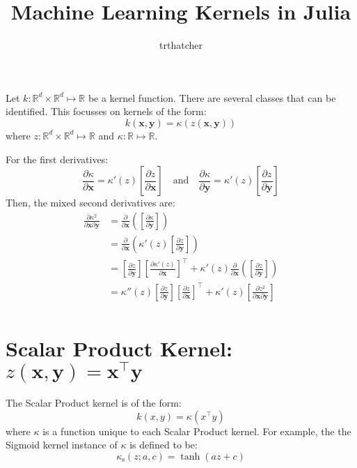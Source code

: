 \documentclass[12pt, a4paper]{article}
\begin{document}

\title{Machine Learning Kernels in Julia}
\author{trthatcher}
\maketitle

Let $k:\mathbb{R}^d \times \mathbb{R}^d \mapsto \mathbb{R}$ be a kernel function. There are several classes that can be identified. This focusses on kernels of the form:
\begin{equation*}
    k(\mathbf{x}, \mathbf{y}) = \kappa(z(\mathbf{x}, \mathbf{y}))
\end{equation*}
where $z:\mathbb{R}^d \times \mathbb{R}^d \mapsto \mathbb{R}$ and $\kappa:\mathbb{R} \mapsto \mathbb{R}$.

For the first derivatives:
\begin{equation*}
    \frac{\partial \kappa}{\partial \mathbf{x}} 
    = \kappa'(z) \left[\frac{\partial z}{\partial \mathbf{x}}\right]
    \quad \text{and} \quad
    \frac{\partial \kappa}{\partial \mathbf{y}} 
    = \kappa'(z) \left[\frac{\partial z}{\partial \mathbf{y}}\right]
\end{equation*}
Then, the mixed second derivatives are:
\begin{align*}
    \frac{\partial \kappa^2}{\partial \mathbf{x} \partial \mathbf{y}}
    &= \frac{\partial}{\partial \mathbf{x}}\left(\left[\frac{\partial \kappa}{\partial \mathbf{y}}\right]\right)\\
    &= \frac{\partial}{\partial \mathbf{x}}\left(\kappa'(z)
    \left[\frac{\partial z}{\partial \mathbf{y}}\right]\right)\\
    &= \left[\frac{\partial z}{\partial \mathbf{y}}\right]
    \left[\frac{\partial \kappa'(z)}{\partial \mathbf{x}}\right]^{\intercal}
    + \kappa'(z)\frac{\partial}{\partial \mathbf{x}}\left(\left[\frac{\partial z}{\partial \mathbf{y}}\right]\right)\\
    &= \kappa''(z)\left[\frac{\partial z}{\partial \mathbf{y}}\right]
    \left[\frac{\partial z}{\partial \mathbf{x}}\right]^{\intercal}
    + \kappa'(z)\left[\frac{\partial z^2}{\partial \mathbf{x} \partial \mathbf{y}}\right]\\
\end{align*}


\section{Scalar Product Kernel: $z(\mathbf{x}, \mathbf{y}) = \mathbf{x}^\intercal\mathbf{y}$}
The Scalar Product kernel is of the form:
\begin{equation*}
    k(x,y) = \kappa\left(x^\intercal y\right)
\end{equation*}
where $\kappa$ is a function unique to each Scalar Product kernel. For example, the the Sigmoid kernel instance of $\kappa$ is defined to be:
\begin{equation*}
    \kappa_{\mathrm{s}}(z;a,c) = \tanh(az + c)
\end{equation*}
\end{document}
